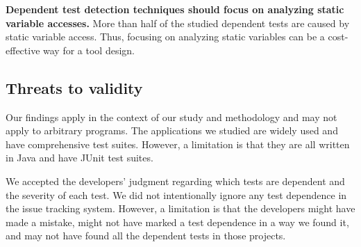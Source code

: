 \vspace{1mm}
\noindent \textbf{Dependent test detection techniques
should focus on analyzing static variable accesses.}
More than half of the studied dependent tests are caused
by static variable access. Thus, focusing on analyzing
static variables can be a cost-effective way for a
tool design. 



\subsection{Threats to validity}

Our findings apply in the context of our study and methodology and may not
apply to arbitrary programs.
The applications we studied are widely used and have comprehensive test suites.
However, a limitation is that they are all written in 
Java and have JUnit test suites.  

We accepted the developers' judgment regarding which tests are dependent
and the severity of each test.  We did not intentionally ignore
any test dependence in the issue tracking system.
However, a limitation is that the developers might have made a mistake,
might not have marked a test dependence in a way we found it, and may not
have found all the dependent tests in those projects. 


